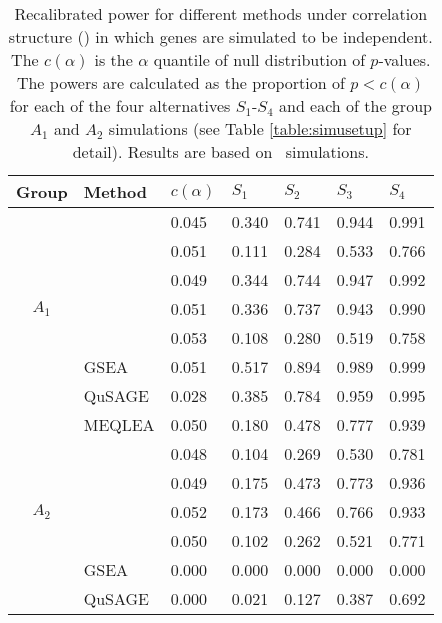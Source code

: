 	\begin{table}[!ht]
		\centering
		\caption[Recalibrated power for different methods]{Recalibrated power for different 
		methods under correlation structure (\aaCase) in which genes are simulated to be 
		independent. The $c(\alpha)$ is the $\alpha$ quantile of null distribution of $p$-values. 
		The powers are calculated as the proportion of $p<c(\alpha)$ for each of the four 
		alternatives $S_1$-$S_4$ and each of the group $A_1$ and $A_2$ simulations (see Table 
		\ref{table:simusetup} for detail). Results are based on \HowmanySimu~simulations.
		}\label{table:power}
		\begin{tabular}{cp{3cm}p{1.5cm}p{1.5cm}p{1.5cm}p{1.5cm}p{1.5cm}}
			\hline
			Group & Method &$c(\alpha)$	& $S_1$ & $S_2$ & $S_3$	&$S_4$  \\ 
			\hline
			\multirow{7}{*}{$A_1$} & \OurMethod & 0.045 & 0.340 & 0.741 & 0.944 & 0.991 \\ 
			&	\genr  & 0.051 & 0.111 & 0.284 & 0.533 & 0.766 \\ 
			&	\gent & 0.049 & 0.344 & 0.744 & 0.947 & 0.992 \\ 
			&	\CMT  & 0.051 & 0.336 & 0.737 & 0.943 & 0.990 \\ 
			&	\CMR  & 0.053 & 0.108 & 0.280 & 0.519 & 0.758 \\ 
			&	GSEA & 0.051 & 0.517 & 0.894 & 0.989 & 0.999 \\ 
			&	QuSAGE & 0.028 & 0.385 & 0.784 & 0.959 & 0.995 \\ 
		\hline
			\multirow{7}{*}{$A_2$} &	MEQLEA & 0.050 & 0.180 & 0.478 & 0.777 & 0.939 \\ 
			&		\genr & 0.048 & 0.104 & 0.269 & 0.530 & 0.781 \\ 
			&		\gent & 0.049 & 0.175 & 0.473 & 0.773 & 0.936 \\  
			&		\CMT & 0.052 & 0.173 & 0.466 & 0.766 & 0.933 \\ 
			&		\CMR & 0.050 & 0.102 & 0.262 & 0.521 & 0.771 \\ 
			&		GSEA & 0.000 & 0.000 & 0.000 & 0.000 & 0.000 \\ 
			&		QuSAGE  & 0.000 & 0.021 & 0.127 & 0.387 & 0.692 \\ 
		\hline
		\end{tabular}
	\end{table}
	
	
	
